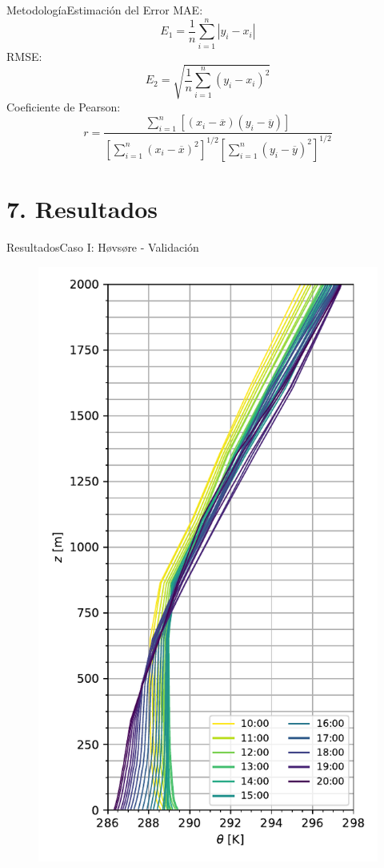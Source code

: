 \documentclass[mathserif,10pt]{beamer}
\newcommand{\be}{\begin{equation}}
\newcommand{\ee}{\end{equation}}
\begin{document}
\begin{frame}{Metodología}{Estimación del Error}
	MAE:
	\be E_1=\frac{1}{n}\sum_{i=1}^n |y_i-x_i| \ee
	RMSE:
	\be E_2=\sqrt{\frac{1}{n}\sum_{i=1}^n (y_i-x_i)^2} \ee
	Coeficiente de Pearson:
	\be r =\frac{\sum\limits_{i=1}^n [(x_i-\overline{x})(y_i-\overline{y})]} {\left[\sum\limits_{i=1}^n (x_i-\overline{x})^2\right]^{1/2} \left[\sum\limits_{i=1}^n (y_i-\overline{y})^2\right]^{1/2}} \ee
\end{frame}








\section{7. Resultados}
\begin{frame}{Resultados}{Caso I: Høvsøre - Validación}
	\begin{figure}[H]
		\begin{minipage}{0.5\linewidth}
			\centering
			\includegraphics[width=0.75\linewidth,trim={0cm 5mm 0cm 0mm},clip]{fig/06/hov/pbl}%

\end{minipage}
\end{figure}
\end{frame}
\end{document}
